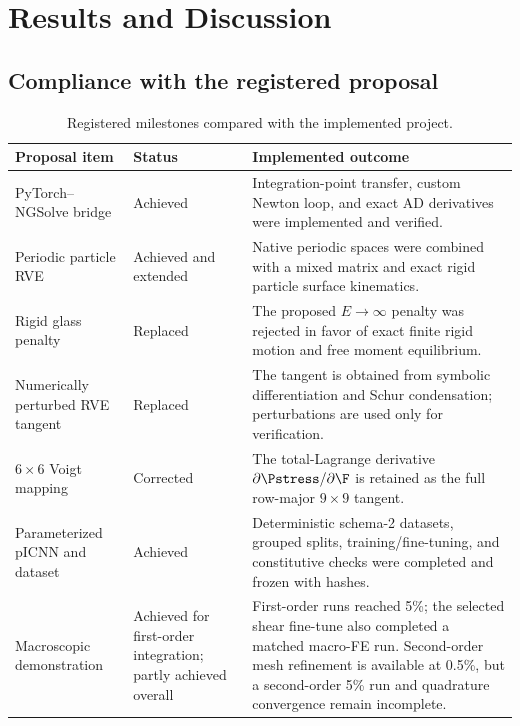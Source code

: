 \chapter{Results and Discussion}
\label{ch:results}

\section{Compliance with the registered proposal}

\begin{table}[H]
\centering
\caption{Registered milestones compared with the implemented project.}
\label{tab:proposal-compliance}
\begin{tabularx}{\textwidth}{@{}p{}p{}X@{}}
\toprule
Proposal item & Status & Implemented outcome\\
\midrule
PyTorch--NGSolve bridge
& Achieved
& Integration-point transfer, custom Newton loop, and exact AD derivatives
were implemented and verified.\\
Periodic particle RVE
& Achieved and extended
& Native periodic spaces were combined with a mixed matrix and exact rigid
particle surface kinematics.\\
Rigid glass penalty
& Replaced
& The proposed \(E\rightarrow\infty\) penalty was rejected in favor of exact
finite rigid motion and free moment equilibrium.\\
Numerically perturbed RVE tangent
& Replaced
& The tangent is obtained from symbolic differentiation and Schur
condensation; perturbations are used only for verification.\\
\(6\times6\) Voigt mapping
& Corrected
& The total-Lagrange derivative \(\partial\Pstress/\partial\F\) is retained as
the full row-major \(9\times9\) tangent.\\
Parameterized pICNN and dataset
& Achieved
& Deterministic schema-2 datasets, grouped splits, training/fine-tuning, and
constitutive checks were completed and frozen with hashes.\\
Macroscopic demonstration
& Achieved for first-order integration; partly achieved overall
& First-order runs reached 5\%; the selected shear fine-tune
also completed a matched macro-FE run. Second-order mesh refinement is
available at 0.5\%, but a second-order 5\% run and
quadrature convergence remain incomplete.\\
\bottomrule
\end{tabularx}
\end{table}


